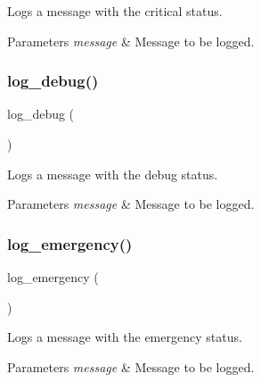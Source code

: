Logs a message with the \textquotesingle{}critical\textquotesingle{} status. 


\begin{DoxyParams}{Parameters}
{\em message} & Message to be logged. \\
\hline
\end{DoxyParams}
\mbox{\label{group__log_ga9333570bec5aeb30b11fa1990c74a72a}} 
\subsubsection{\texorpdfstring{log\+\_\+debug()}{log\_debug()}}
{\footnotesize\ttfamily log\+\_\+debug (\begin{DoxyParamCaption}\item[{message}]{ }\end{DoxyParamCaption})}



Logs a message with the \textquotesingle{}debug\textquotesingle{} status. 


\begin{DoxyParams}{Parameters}
{\em message} & Message to be logged. \\
\hline
\end{DoxyParams}
\mbox{\label{group__log_ga391012c00347e7080504daf878501a8c}} 
\subsubsection{\texorpdfstring{log\+\_\+emergency()}{log\_emergency()}}
{\footnotesize\ttfamily log\+\_\+emergency (\begin{DoxyParamCaption}\item[{message}]{ }\end{DoxyParamCaption})}



Logs a message with the \textquotesingle{}emergency\textquotesingle{} status. 


\begin{DoxyParams}{Parameters}
{\em message} & Message to be logged. \\
\hline
\end{DoxyParams}
\mbox{\label{group__log_gaf7fc980e941ae8915356cd89ccac471d}} 
